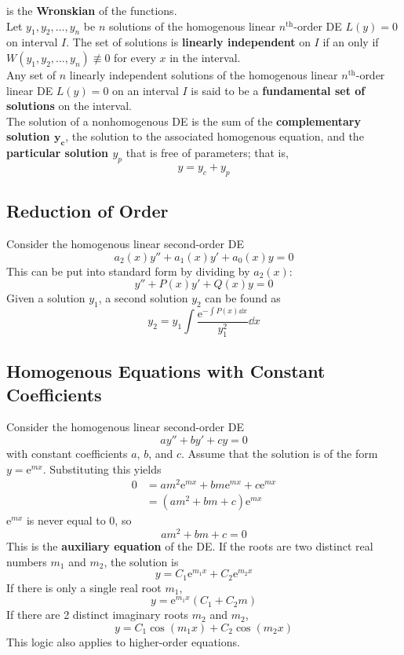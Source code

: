 \documentclass[12pt, A4]{article}
\newcommand{\en}{\text{e}}
\renewcommand{\th}{\text{th}}
\begin{document}
				is the \textbf{Wronskian} of the functions. \\
			Let \(y_1, y_2, \ldots, y_n\) be \(n\) solutions of the homogenous linear \(n^{\th}\)-order DE \(L(y) = 0\) on interval \(I\). The set of solutions is \textbf{linearly independent} on \(I\) if an only if \(W(y_1, y_2, \ldots, y_n) \not\equiv 0\) for every \(x\) in the interval. \\
			Any set of \(n\) linearly independent solutions of the homogenous linear \(n^{\th}\)-order linear DE \(L(y) = 0\) on an interval \(I\) is said to be a \textbf{fundamental set of solutions} on the interval. \\
			The solution of a nonhomogenous DE is the sum of the \textbf{complementary solution \(\bm{y_c}\)}, the solution to the associated homogenous equation, and the \textbf{particular solution \(y_p\)} that is free of parameters; that is,
				\[y = y_c + y_p\]
		\subsection{Reduction of Order}
			Consider the homogenous linear second-order DE
				\[a_2(x)y''+ a_1(x)y' + a_0(x)y = 0\]
				This can be put into standard form by dividing by \(a_2(x)\):
				\[y'' + P(x)y' + Q(x)y = 0\]
				Given a solution \(y_1\), a second solution \(y_2\) can be found as
				\[\boxed{y_2 = y_1\int \frac{\en^{-\int P(x) \dd{x}}}{y_1^2}\dd{x}}\]
		\subsection{Homogenous Equations with Constant Coefficients}
			Consider the homogenous linear second-order DE
				\[ay'' + by' + cy = 0\]
				with constant coefficients \(a\), \(b\), and \(c\). Assume that the solution is of the form \(y = \en^{mx}\). Substituting this yields
				\begin{align*}
					0 &= am^2\en^{mx} + bm\en^{mx} + c\en^{mx} \\
						&= (am^2 + bm + c)\en^{mx}
				\end{align*}
				\(\en^{mx}\) is never equal to 0, so
				\[\boxed{am^2 + bm + c = 0}\]
				This is the \textbf{auxiliary equation} of the DE. If the roots are two distinct real numbers \(m_1\) and \(m_2\), the solution is
				\[y = C_1\en^{m_1x} + C_2\en^{m_2x}\]
				If there is only a single real root \(m_1\),
				\[y = \en^{m_1x}(C_1 + C_2m)\]
				If there are 2 distinct imaginary roots \(m_2\) and \(m_2\),
				\[y = C_1\cos(m_1 x) + C_2\cos(m_2 x)\]
				This logic also applies to higher-order equations.
\end{document}
